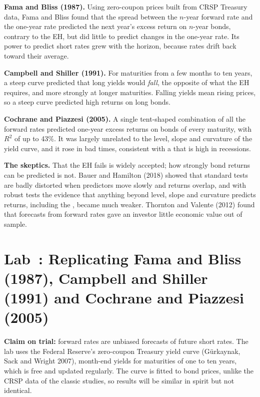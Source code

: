 \textbf{Fama and Bliss (1987).} Using zero-coupon prices built from CRSP Treasury data, Fama and Bliss found that the spread between the $n$-year forward rate and the one-year rate predicted the next year's excess return on $n$-year bonds, contrary to the EH, but did little to predict changes in the one-year rate. Its power to predict short rates grew with the horizon, because rates drift back toward their average.

\textbf{Campbell and Shiller (1991).} For maturities from a few months to ten years, a steep curve predicted that long yields would \emph{fall}, the opposite of what the EH requires, and more strongly at longer maturities. Falling yields mean rising prices, so a steep curve predicted high returns on long bonds.

\textbf{Cochrane and Piazzesi (2005).} A single tent-shaped combination of all the forward rates predicted one-year excess returns on bonds of every maturity, with $R^2$ of up to 43\%. It was largely unrelated to the level, slope and curvature of the yield curve, and it rose in bad times, consistent with a  that is high in recessions.

\textbf{The skeptics.} That the EH fails is widely accepted; how strongly bond returns can be predicted is not. Bauer and Hamilton (2018) showed that standard tests are badly distorted when predictors move slowly and returns overlap, and with robust tests the evidence that anything beyond level, slope and curvature predicts returns, including the , became much weaker. Thornton and Valente (2012) found that forecasts from forward rates gave an investor little economic value out of sample.

\section{Lab~\thechapter: Replicating Fama and Bliss (1987), Campbell and Shiller (1991) and Cochrane and Piazzesi (2005)}
\label{sec:07-lab}

\textbf{Claim on trial:} forward rates are unbiased forecasts of future short rates. The lab uses the Federal Reserve's zero-coupon Treasury yield curve (G\"urkaynak, Sack and Wright 2007), month-end yields for maturities of one to ten years, which is free and updated regularly. The curve is fitted to bond prices, unlike the CRSP data of the classic studies, so results will be similar in spirit but not identical.

